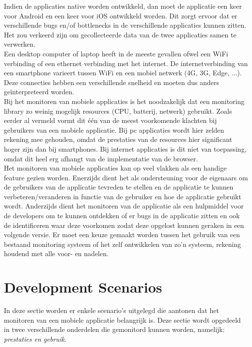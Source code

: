 Indien de applicaties native worden ontwikkeld, dan moet de applicatie een keer voor Android en een keer voor iOS ontwikkeld worden. Dit zorgt ervoor dat er verschillende bugs en/of bottlenecks in de verschillende applicaties kunnen zitten. Het zou verkeerd zijn om gecollecteerde data van de twee applicaties samen te verwerken. \\
Een desktop computer of laptop heeft in de meeste gevallen ofwel een WiFi verbinding of een ethernet verbinding met het internet. De internetverbinding van een smartphone varieert tussen WiFi en een mobiel netwerk (4G, 3G, Edge, ...). Deze connecties hebben een verschillende snelheid en moeten dus anders ge\"interpreteerd worden. \\

Bij het monitoren van mobiele applicaties is het noodzakelijk dat een monitoring library zo weinig mogelijk resources (CPU, batterij, netwerk) gebruikt. Zoals eerder al vermeld vormt dit \'e\'en van de meest voorkomende klachten bij gebruikers van een mobiele applicatie. Bij pc applicaties wordt hier zelden rekening mee gehouden, omdat de prestaties van de resources hier significant hoger zijn dan bij smartphones. Bij internet applicaties is dit niet van toepassing, omdat dit heel erg afhangt van de implementatie van de browser. \\


Het monitoren van mobiele applicaties kan op veel vlakken als een handige feature gezien worden. Enerzijds dient het als ondersteuning voor de eigenaars om de gebruikers van de applicatie tevreden te stellen en de applicatie te kunnen verbeteren/veranderen in functie van de gebruiker en hoe de applicatie gebruikt wordt. Anderzijds dient het monitoren van de applicatie als een hulpmiddel voor de developers om te kunnen ontdekken of er bugs in de applicatie zitten en ook de identificeren waar deze voorkomen zodat deze opgelost kunnen geraken in een volgende versie. Er moet een keuze gemaakt worden tussen het gebruik van een bestaand monitoring systeem of het zelf ontwikkelen van zo'n systeem, rekening houdend met alle voor- en nadelen. \\


\section{Development Scenarios}
In deze sectie worden er enkele scenario's uitgelegd die aantonen dat het monitoren van een mobiele applicatie belangrijk is. Deze sectie wordt opgedeeld in twee verschillende onderdelen die gemonitord kunnen worden, namelijk: \textit{prestaties en gebruik}.


